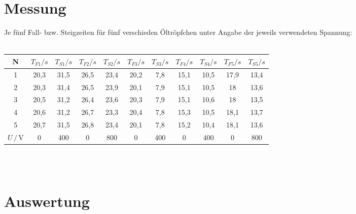 \documentclass[a4paper,12pt]{article}
\begin{document}
\section{Messung}
Je fünf Fall- bzw. Steigzeiten für fünf verschieden Öltröpfchen unter Angabe der jeweils verwendeten Spannung:\\ \\
\begin{tabular}{c|c|c|c|c|c|c|c|c|c|c}
N&$T_{F1}/s$& $T_{S1}/s$&$T_{F2}/s$& $T_{S2}/s$&$T_{F3}/s$& $T_{S3}/s$&$T_{F4}/s$& $T_{S4}/s$&$T_{F5}/s$& $T_{S5}/s$\\ \hline
1&20,3  & 31,5 &26,5  &23,4  &20,2  &7,8& 15,1 &10,5  &17,9  &13,4   \\ \hline
2& 20,3 & 31,4 &26,5  &23,9  &20,1  &7,9 &15,1&10,5  &18  &13,6    \\ \hline
3&  20,5& 31,2 &26,4  &23,6  &20,3  &7,9  &15,1  &10,6  &18  &13,5   \\ \hline
4& 20,6 &31,2  &26,7  &23,3  &20,4  &7,8  &15,3  &10,5  &18,1  &13,7   \\ \hline
5& 20,7 &31,5  &26,8  &23,4  & 20,1 &7,8  &15,2  &10,4  &18,1  &13,6 \\ \hline
$U\,/\,$V & 0 & 400 & 0 & 800 & 0 & 400 & 0 & 400 & 0 & 800

\end{tabular}\\ \\
\section{Auswertung}
\end{document}
